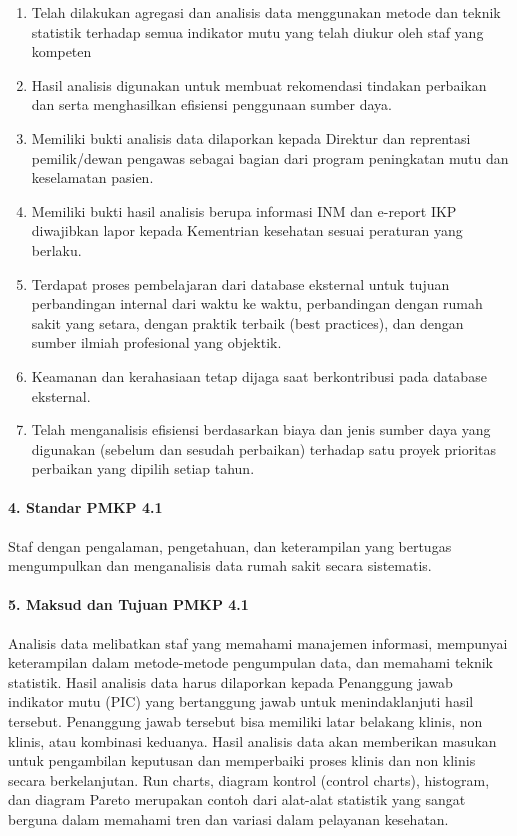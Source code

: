\documentclass[
]{book}
\providecommand{\tightlist}{%
  \setlength{\itemsep}{0pt}\setlength{\parskip}{0pt}}
\begin{document}
\begin{enumerate}
\def\labelenumi{\alph{enumi}.}
\tightlist
\item
  Telah dilakukan agregasi dan analisis data menggunakan metode dan teknik statistik terhadap semua indikator mutu yang telah diukur oleh staf yang kompeten
\item
  Hasil analisis digunakan untuk membuat rekomendasi tindakan perbaikan dan serta menghasilkan efisiensi penggunaan sumber daya.
\item
  Memiliki bukti analisis data dilaporkan kepada Direktur dan reprentasi pemilik/dewan pengawas sebagai bagian dari program peningkatan mutu dan keselamatan pasien.
\item
  Memiliki bukti hasil analisis berupa informasi INM dan e-report IKP diwajibkan lapor kepada Kementrian kesehatan sesuai peraturan yang berlaku.
\item
  Terdapat proses pembelajaran dari database eksternal untuk tujuan perbandingan internal dari waktu ke waktu, perbandingan dengan rumah sakit yang setara, dengan praktik terbaik (best practices), dan dengan sumber ilmiah profesional yang objektik.
\item
  Keamanan dan kerahasiaan tetap dijaga saat berkontribusi pada database eksternal.
\item
  Telah menganalisis efisiensi berdasarkan biaya dan jenis sumber daya yang digunakan (sebelum dan sesudah perbaikan) terhadap satu proyek prioritas perbaikan yang dipilih setiap tahun.
\end{enumerate}

\hypertarget{standar-pmkp-4.1}{%
\paragraph*{4. Standar PMKP 4.1}\label{standar-pmkp-4.1}}

Staf dengan pengalaman, pengetahuan, dan keterampilan yang bertugas mengumpulkan dan menganalisis data rumah sakit secara sistematis.

\hypertarget{maksud-dan-tujuan-pmkp-4.1}{%
\paragraph*{5. Maksud dan Tujuan PMKP 4.1}\label{maksud-dan-tujuan-pmkp-4.1}}

Analisis data melibatkan staf yang memahami manajemen informasi, mempunyai keterampilan dalam metode-metode pengumpulan data, dan memahami teknik statistik. Hasil analisis data harus dilaporkan kepada Penanggung jawab indikator mutu (PIC) yang bertanggung jawab untuk menindaklanjuti hasil tersebut. Penanggung jawab tersebut bisa memiliki latar belakang klinis, non klinis, atau kombinasi keduanya. Hasil analisis data akan memberikan masukan untuk pengambilan keputusan dan memperbaiki proses klinis dan non klinis secara berkelanjutan. Run charts, diagram kontrol (control charts), histogram, dan diagram Pareto merupakan contoh dari alat-alat statistik yang sangat berguna dalam memahami tren dan variasi dalam pelayanan kesehatan.
\end{document}
